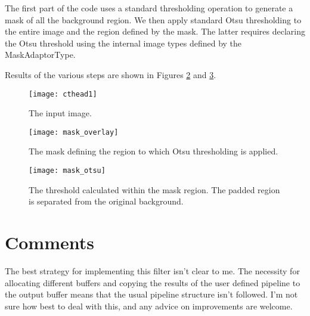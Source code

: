 \documentclass{InsightArticle}
\begin{document}
The first part of the code uses a standard thresholding operation to
generate a mask of all the background region. We then apply standard
Otsu thresholding to the entire image and the region defined by the
mask. The latter requires declaring the Otsu threshold using the
internal image types defined by the MaskAdaptorType.

Results of the various steps are shown in Figures \ref{mask} and
\ref{maskotsu}.

\begin{figure}[htbp]
\centering
\texttt{[image: cthead1]}
\caption{The input image.\label{cthead1}}
\end{figure}

\begin{figure}[htbp]
\centering
\texttt{[image: mask\_overlay]}
\caption{The mask defining the region to which Otsu thresholding is applied.\label{mask}}
\end{figure}

\begin{figure}[htbp]
\centering
\texttt{[image: mask\_otsu]}
\caption{The threshold calculated within the mask region. The padded region is separated from the original background.\label{maskotsu}}
\end{figure}

\section{Comments}
The best strategy for implementing this filter isn't clear to me. The
necessity for allocating different buffers and copying the results of
the user defined pipeline to the output buffer means that the usual
pipeline structure isn't followed. I'm not sure how best to deal with
this, and any advice on improvements are welcome.





\nocite{ITKSoftwareGuide}
\end{document}
